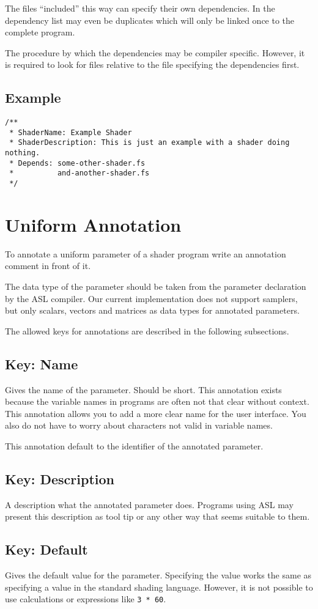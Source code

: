 \documentclass[11pt,a4paper]{scrreprt}
\newcommand{\key}[1]{\subsection{Key: #1}}
\begin{document}
The files ``included'' this way can specify their own dependencies. In the 
dependency list may even be duplicates which will only be linked once to the 
complete program.

The procedure by which the dependencies may be compiler specific. However, it is
required to look for files relative to the file specifying the dependencies 
first.

\subsection{Example}
\begin{lstlisting}
/**
 * ShaderName: Example Shader
 * ShaderDescription: This is just an example with a shader doing nothing.
 * Depends: some-other-shader.fs
 *          and-another-shader.fs
 */
\end{lstlisting}

\section{Uniform Annotation}
To annotate a uniform parameter of a shader program write an annotation comment 
in front of it.

The data type of the parameter should be taken from the parameter declaration by 
the ASL compiler. Our current implementation does not support samplers, but only 
scalars, vectors and matrices as data types for annotated parameters.

The allowed keys for annotations are described in the following subsections.

\key{Name}
Gives the name of the parameter. Should be short. This annotation exists because 
the variable names in programs are often not that clear without context. This 
annotation allows you to add a more clear name for the user interface. You also 
do not have to worry about characters not valid in variable names.

This annotation default to the identifier of the annotated parameter.

\key{Description}
A description what the annotated parameter does. Programs using ASL may present 
this description as tool tip or any other way that seems suitable to them.

\key{Default}
Gives the default value for the parameter. Specifying the value works the same 
as specifying a value in the standard shading language. However, it is not 
possible to use calculations or expressions like \lstinline$3 * 60$.
\end{document}
